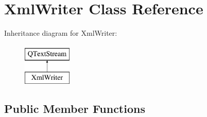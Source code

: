 \hypertarget{class_xml_writer}{}\section{Xml\+Writer Class Reference}
\label{class_xml_writer}
Inheritance diagram for Xml\+Writer\+:\begin{figure}[H]
\begin{center}
\leavevmode
\includegraphics[height=2.000000cm]{class_xml_writer}
\end{center}
\end{figure}
\subsection*{Public Member Functions}
